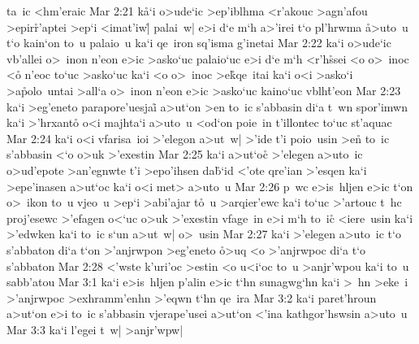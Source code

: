 ta~ic
<hm'eraic\bibvsend
\vs Mar 2:21
k\r{a}`i
o>ude`ic
>ep'iblhma
<r'akouc
>agn'afou
>epir\r{r}'aptei
>ep`i
<imat'iw|\r{}
palai~w|
e>i
d`e
m`h
a>'irei
t`o
pl'hrwma
\r{a}>uto~u
t`o
kain`on
to~u
palaio~u
ka`i
qe~iron
sq'isma
g'inetai\bibvsend
\vs Mar 2:22
ka`i
o>ude`ic
vb'allei
o>~inon
n'eon
e>ic
>asko`uc
palaio`uc
e>i
d`e
m`h
<r'h\r{s}sei
<o
o>~inoc
<o\r{}
n'eoc
to`uc
>asko`uc
ka`i
<o
o>~inoc
>e\r{k}qe~itai
ka`i
o<i
>asko`i
>a\r{p}olo~untai
>all`a
o>~inon
n'eon
e>ic
>asko`uc
kaino`uc
vblh\r{t}'eon\bibvsend
{}
\vs Mar 2:23
ka`i
>eg'eneto
parapore'uesjai\r{}
a>ut`on
>en
to~ic
s'abbasin
di`a
t~wn
spor'imwn
ka`i
>'hrxanto\r{}
o<i
majhta`i
a>uto~u
<od`on
poie~in
t'illontec
to`uc
st'aquac\bibvsend
\vs Mar 2:24
ka`i
o<i
vfarisa~ioi
>'elegon
a>ut~w|
>'ide
t'i
poio~usin
>e\r{n}
to~ic
s'abbasin
<`o
o>uk
>'exestin\bibvsend
\vs Mar 2:25
ka`i
a>ut`oc\r{}
>'elegen
a>uto~ic
o>ud'epote
>an'egnwte
t'i
>epo'ihsen
da\r{b}`id
<'ote
qre'ian
>'esqen
ka`i
>epe'inasen
a>ut`oc
ka`i
o<i
met>
a>uto~u\bibvsend
\vs Mar 2:26
p~wc
e>is~hljen
e>ic
t`on
o>~ikon
to~u
vjeo~u
>ep`i
>abi'ajar
t\r{o}~u
>arqier'ewc
ka`i
to`uc
>'artouc
t~hc
proj'esewc
>'efagen
o<`uc
o>uk
>'exestin
vfage~in
e>i
m`h
to~ic\r{}
<iere~usin
ka`i
>'edwken
ka`i
to~ic
s`un
a>ut~w|
o>~usin\bibvsend
\vs Mar 2:27
ka`i
>'elegen
a>uto~ic
t`o
s'abbaton
di`a
t`on
>'anjrwpon
>eg'eneto
\r{o}>uq
<o
>'anjrwpoc
di`a
t`o
s'abbaton\bibvsend
\vs Mar 2:28
<'wste
k'uri'oc
>estin
<o
u<i`oc
to~u
>anjr'wpou
ka`i
to~u
sabb'atou\bibvsend
\vs Mar 3:1
ka`i
e>is~hljen
p'alin
e>ic
t`hn
sunagwg`hn
ka`i
>~hn
>eke~i
>'anjrwpoc
>exhramm'enhn
>'eqwn
t`hn
qe~ira\bibvsend
\vs Mar 3:2
ka`i
paret'hroun
a>ut`on
e>i
to~ic
s'abbasin
vjerape'usei
a>ut`on
<'ina
kathgor'hswsin
a>uto~u\bibvsend
\vs Mar 3:3
ka`i
l'egei
t~w|
>anjr'wpw|
